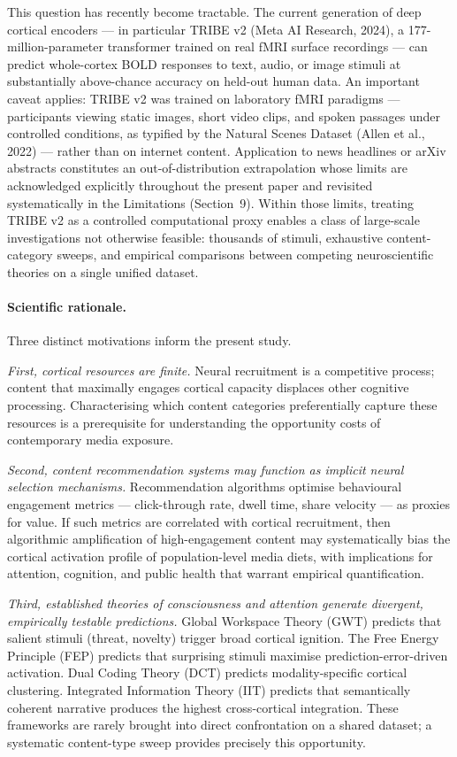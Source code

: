 \documentclass[11pt,letterpaper]{article}
\numberwithin{equation}{section}
\begin{document}
This question has recently become tractable. The current generation of deep cortical encoders --- in particular TRIBE v2 (Meta AI Research, 2024), a 177-million-parameter transformer trained on real fMRI surface recordings --- can predict whole-cortex BOLD responses to text, audio, or image stimuli at substantially above-chance accuracy on held-out human data. An important caveat applies: TRIBE v2 was trained on laboratory fMRI paradigms --- participants viewing static images, short video clips, and spoken passages under controlled conditions, as typified by the Natural Scenes Dataset (Allen et al., 2022) --- rather than on internet content. Application to news headlines or arXiv abstracts constitutes an out-of-distribution extrapolation whose limits are acknowledged explicitly throughout the present paper and revisited systematically in the Limitations (Section~9). Within those limits, treating TRIBE v2 as a controlled computational proxy enables a class of large-scale investigations not otherwise feasible: thousands of stimuli, exhaustive content-category sweeps, and empirical comparisons between competing neuroscientific theories on a single unified dataset.

\paragraph{Scientific rationale.} Three distinct motivations inform the present study.

\textit{First, cortical resources are finite.} Neural recruitment is a competitive process; content that maximally engages cortical capacity displaces other cognitive processing. Characterising which content categories preferentially capture these resources is a prerequisite for understanding the opportunity costs of contemporary media exposure.

\textit{Second, content recommendation systems may function as implicit neural selection mechanisms.} Recommendation algorithms optimise behavioural engagement metrics --- click-through rate, dwell time, share velocity --- as proxies for value. If such metrics are correlated with cortical recruitment, then algorithmic amplification of high-engagement content may systematically bias the cortical activation profile of population-level media diets, with implications for attention, cognition, and public health that warrant empirical quantification.

\textit{Third, established theories of consciousness and attention generate divergent, empirically testable predictions.} Global Workspace Theory (GWT) predicts that salient stimuli (threat, novelty) trigger broad cortical ignition. The Free Energy Principle (FEP) predicts that surprising stimuli maximise prediction-error-driven activation. Dual Coding Theory (DCT) predicts modality-specific cortical clustering. Integrated Information Theory (IIT) predicts that semantically coherent narrative produces the highest cross-cortical integration. These frameworks are rarely brought into direct confrontation on a shared dataset; a systematic content-type sweep provides precisely this opportunity.
\end{document}

